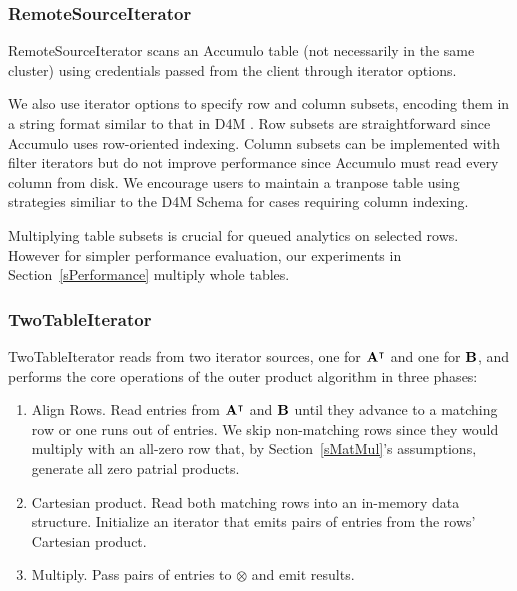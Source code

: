 \subsubsection{RemoteSourceIterator}
RemoteSourceIterator scans an Accumulo table
(not necessarily in the same cluster) %
using credentials passed from the client through iterator options.

We also use iterator options to specify row and column subsets, 
encoding them in a string format similar to that in D4M \cite{kepner2012dynamic}.
Row subsets are straightforward since Accumulo uses row-oriented indexing.
Column subsets can be implemented with filter iterators
but do not improve performance since Accumulo must read every column from disk.
We encourage users to maintain a tranpose table
using strategies similiar to the D4M Schema \cite{kepner2013d4m}
for cases requiring column indexing.

Multiplying table subsets is crucial for queued analytics on selected rows.
However for simpler performance evaluation, 
our experiments in Section~\ref{sPerformance} multiply whole tables.

\subsubsection{TwoTableIterator}
TwoTableIterator reads from two iterator sources, one for $\mathbf{A^{\intercal}}$ and one for $\mathbf{B}$,
and performs the core operations of the outer product algorithm in three phases:
\begin{enumerate}
\item Align Rows.  Read entries from $\mathbf{A^{\intercal}}$ and $\mathbf{B}$ until they advance to a matching row
or one runs out of entries. We skip non-matching rows 
since they would multiply with an all-zero row that, by Section~\ref{sMatMul}'s assumptions,
generate all zero patrial products.
\item Cartesian product. Read both matching rows into an in-memory data structure. 
Initialize an iterator that emits pairs of entries from the rows' Cartesian product.
\item Multiply. Pass pairs of entries to $\otimes$ and emit results. 
\end{enumerate}


